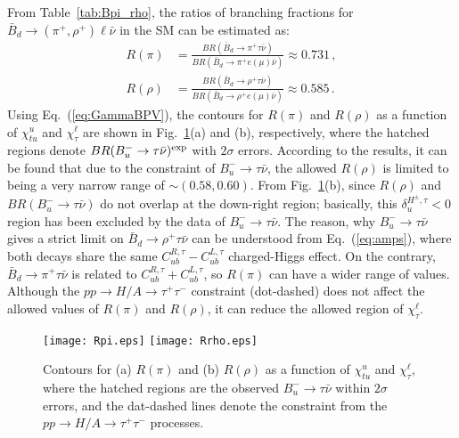 \documentclass[prd,preprint,superscriptaddress,amsmath,amssymb]{revtex4}
\begin{document}
  From Table~\ref{tab:Bpi_rho}, the ratios of branching fractions for $\bar B_d \to (\pi^+, \rho^+) \ell \bar\nu$ in the SM can be estimated as:
   \begin{align}
   R(\pi) & = \frac{BR(\bar B_d \to \pi^+ \tau \bar\nu)}{BR(\bar B_d \to \pi^+ e(\mu) \bar\nu)} \approx 0.731 \,, \nonumber \\
   R(\rho) & = \frac{BR(\bar B_d \to \rho^+ \tau \bar\nu)}{BR(\bar B_d \to \rho^+ e(\mu) \bar\nu)} \approx 0.585\,.
   \end{align}
    Using Eq.~(\ref{eq:GammaBPV}), the contours for $R(\pi)$ and $R(\rho)$ as a function of $\chi^u_{tu}$ and $\chi^\ell_\tau$  are shown in Fig.~\ref{fig:Rpi_Rrho}(a) and (b), respectively, where the hatched regions denote $BR(B^-_u \to \tau \bar\nu)^{\rm exp}$ with $2\sigma$ errors. According to the results, it can be found that due to the constraint of $B^-_u \to \tau \bar\nu$, the allowed $R(\rho)$ is limited to being a very narrow range of $\sim(0.58, 0.60)$. From Fig.~\ref{fig:Rpi_Rrho}(b), since $R(\rho)$ and $BR(B^-_u \to \tau \bar\nu)$ do not  overlap at the down-right region;  basically,  this $\delta^{H^\pm,\tau}_u < 0$ region has been excluded by the data of $B^-_u \to \tau \bar \nu$. The reason, why $B^-_u \to \tau \bar\nu$ gives a strict limit on $\bar B_d \to \rho^+ \tau \bar \nu$ can be understood from Eq.~(\ref{eq:amps}), where  both decays share the same $C^{R,\tau}_{ub}-C^{L,\tau}_{ub}$ charged-Higgs effect. On the contrary, $\bar B_d \to \pi^+ \tau \bar \nu$ is related to $C^{R,\tau}_{ub}+C^{L,\tau}_{ub}$, so $R(\pi)$ can have a wider range of values.  Although the $pp\to H/A \to \tau^+ \tau^-$ constraint (dot-dashed) does not affect the allowed values of $R(\pi)$ and $R(\rho)$, it can reduce the allowed region of $\chi^\ell_\tau$. 
    
     \begin{figure}[phtb]
\texttt{[image: Rpi.eps]}
\texttt{[image: Rrho.eps]}
\caption{ Contours for (a) $R(\pi)$ and (b) $R(\rho)$ as a function of $\chi^u_{tu}$ and $\chi^\ell_\tau$, where the hatched regions are the observed  $B^-_u \to \tau \bar\nu$ within $2\sigma$ errors, and the dat-dashed lines denote the constraint from the $pp\to H/A\to \tau^+ \tau^-$ processes. }
\label{fig:Rpi_Rrho}
\end{figure}  
    
\end{document}
